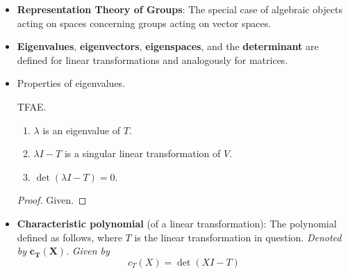 \documentclass[../notes.tex]{subfiles}
\begin{document}
\begin{itemize}
\begin{itemize}
    \end{itemize}
    \item \textbf{Representation Theory of Groups}: The special case of algebraic objects acting on spaces concerning groups acting on vector spaces.
    \item \textbf{Eigenvalues}, \textbf{eigenvectors}, \textbf{eigenspaces}, and the \textbf{determinant} are defined for linear transformations and analogously for matrices.
    \item Properties of eigenvalues.
    \begin{proposition}\label{prp:12.12}
        TFAE.
        \begin{enumerate}
            \item $\lambda$ is an eigenvalue of $T$.
            \item $\lambda I-T$ is a singular linear transformation of $V$.
            \item $\det(\lambda I-T)=0$.
        \end{enumerate}
        \begin{proof}
            Given.
        \end{proof}
    \end{proposition}
    \item \textbf{Characteristic polynomial} (of a linear transformation): The polynomial defined as follows, where $T$ is the linear transformation in question. \emph{Denoted by} $\bm{c_T(X)}$. \emph{Given by}
    \begin{equation*}
        c_T(X) = \det(XI-T)
    \end{equation*}

\end{itemize}
\end{document}
